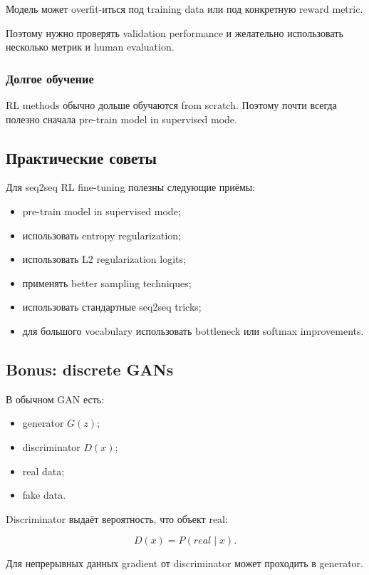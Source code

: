 \documentclass[a4paper,12pt]{article}
\begin{document}
Модель может overfit-иться под training data или под конкретную reward metric.

Поэтому нужно проверять validation performance и желательно использовать несколько метрик и human evaluation.

\subsubsection{Долгое обучение}

RL methods обычно дольше обучаются from scratch. Поэтому почти всегда полезно сначала pre-train model in supervised mode.

\subsection{Практические советы}

Для seq2seq RL fine-tuning полезны следующие приёмы:

\begin{itemize}
    \item pre-train model in supervised mode;
    \item использовать entropy regularization;
    \item использовать L2 regularization logits;
    \item применять better sampling techniques;
    \item использовать стандартные seq2seq tricks;
    \item для большого vocabulary использовать bottleneck или softmax improvements.
\end{itemize}

\subsection{Bonus: discrete GANs}

В обычном GAN есть:

\begin{itemize}
    \item generator \(G(z)\);
    \item discriminator \(D(x)\);
    \item real data;
    \item fake data.
\end{itemize}

Discriminator выдаёт вероятность, что объект real:

\[
D(x)=P(real\mid x).
\]

Для непрерывных данных gradient от discriminator может проходить в generator.
\end{document}
